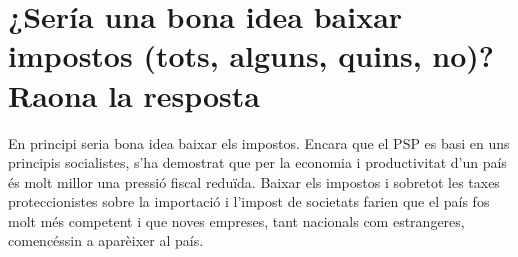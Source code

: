 \section{¿Sería una bona idea baixar impostos (tots, alguns, quins, no)? 
Raona la resposta}

En principi seria bona idea baixar els impostos. Encara que el PSP es basi
en uns principis socialistes, s'ha demostrat que per la economia
i productivitat d'un país és molt millor una pressió fiscal reduïda. Baixar
els impostos i sobretot les taxes proteccionistes sobre la importació 
i l'impost de societats farien
que el país fos molt més competent i que noves empreses, tant nacionals
com estrangeres, comencéssin a aparèixer al país.
  

